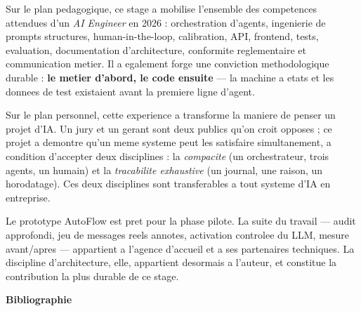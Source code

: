 \documentclass[12pt,a4paper,openany]{report}
\begin{document}
Sur le plan pedagogique, ce stage a mobilise l'ensemble des competences attendues d'un \emph{AI Engineer} en 2026 : orchestration d'agents, ingenierie de prompts structures, human-in-the-loop, calibration, API, frontend, tests, evaluation, documentation d'architecture, conformite reglementaire et communication metier. Il a egalement forge une conviction methodologique durable : \textbf{le metier d'abord, le code ensuite} --- la machine a etats et les donnees de test existaient avant la premiere ligne d'agent.

Sur le plan personnel, cette experience a transforme la maniere de penser un projet d'IA. Un jury et un gerant sont deux publics qu'on croit opposes ; ce projet a demontre qu'un meme systeme peut les satisfaire simultanement, a condition d'accepter deux disciplines : la \emph{compacite} (un orchestrateur, trois agents, un humain) et la \emph{tracabilite exhaustive} (un journal, une raison, un horodatage). Ces deux disciplines sont transferables a tout systeme d'IA en entreprise.

Le prototype AutoFlow est pret pour la phase pilote. La suite du travail --- audit approfondi, jeu de messages reels annotes, activation controlee du LLM, mesure avant/apres --- appartient a l'agence d'accueil et a ses partenaires techniques. La discipline d'architecture, elle, appartient desormais a l'auteur, et constitue la contribution la plus durable de ce stage.

\cleardoublepage
{}

\vspace*{1cm}
{\noindent \Huge \bfseries \color{titleBlue} Bibliographie \par}
\vspace{1.2cm}
\end{document}
